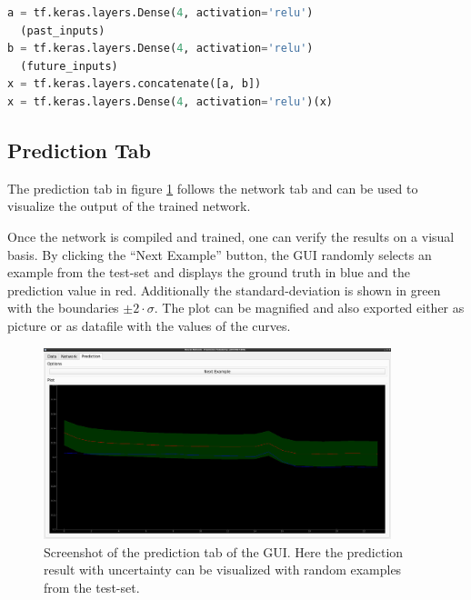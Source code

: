 		\newpage
		\begin{lstlisting}[caption={Linear Fit}, language=python, label={p:nn_example}]
a = tf.keras.layers.Dense(4, activation='relu')
  (past_inputs)
b = tf.keras.layers.Dense(4, activation='relu')
  (future_inputs)  
x = tf.keras.layers.concatenate([a, b])
x = tf.keras.layers.Dense(4, activation='relu')(x)
		\end{lstlisting}
		
		
		\subsection{Prediction Tab}
		The prediction tab in figure \ref{f:gui_prediction_tab} follows the network tab and can be used to visualize the output of the trained network.
		
		Once the network is compiled and trained, one can verify the results on a visual basis. By clicking the \enquote{Next Example} button, the GUI randomly selects an example from the test-set and displays the ground truth in blue and the prediction value in red. Additionally the standard-deviation is shown in green with the boundaries $\pm 2\cdot\sigma$. \newline
		The plot can be magnified and also exported either as picture or as datafile with the values of the curves.
		
		\begin{figure}[htb]
		\centering
		\includegraphics[width=0.9\textwidth]{./4_GUI/gui_prediction_tab.jpg}
		\caption{Screenshot of the prediction tab of the GUI. Here the prediction result with uncertainty can be visualized with random examples from the test-set.}
		\label{f:gui_prediction_tab}
		\end{figure}
